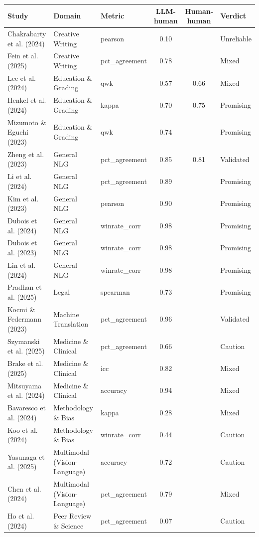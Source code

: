 \begin{tabular}{@{}l l l c c l@{}}
\toprule
Study & Domain & Metric & LLM-human & Human-human & Verdict \\
\midrule
Chakrabarty et al. (2024) & Creative Writing & pearson & 0.10 &  & Unreliable \\
Fein et al. (2025) & Creative Writing & pct\_agreement & 0.78 &  & Mixed \\
Lee et al. (2024) & Education \& Grading & qwk & 0.57 & 0.66 & Mixed \\
Henkel et al. (2024) & Education \& Grading & kappa & 0.70 & 0.75 & Promising \\
Mizumoto \& Eguchi (2023) & Education \& Grading & qwk & 0.74 &  & Promising \\
Zheng et al. (2023) & General NLG & pct\_agreement & 0.85 & 0.81 & Validated \\
Li et al. (2024) & General NLG & pct\_agreement & 0.89 &  & Promising \\
Kim et al. (2023) & General NLG & pearson & 0.90 &  & Promising \\
Dubois et al. (2024) & General NLG & winrate\_corr & 0.98 &  & Promising \\
Dubois et al. (2023) & General NLG & winrate\_corr & 0.98 &  & Promising \\
Lin et al. (2024) & General NLG & winrate\_corr & 0.98 &  & Promising \\
Pradhan et al. (2025) & Legal & spearman & 0.73 &  & Promising \\
Kocmi \& Federmann (2023) & Machine Translation & pct\_agreement & 0.96 &  & Validated \\
Szymanski et al. (2025) & Medicine \& Clinical & pct\_agreement & 0.66 &  & Caution \\
Brake et al. (2025) & Medicine \& Clinical & icc & 0.82 &  & Mixed \\
Mitsuyama et al. (2024) & Medicine \& Clinical & accuracy & 0.94 &  & Mixed \\
Bavaresco et al. (2024) & Methodology \& Bias & kappa & 0.28 &  & Mixed \\
Koo et al. (2024) & Methodology \& Bias & winrate\_corr & 0.44 &  & Caution \\
Yasunaga et al. (2025) & Multimodal (Vision-Language) & accuracy & 0.72 &  & Caution \\
Chen et al. (2024) & Multimodal (Vision-Language) & pct\_agreement & 0.79 &  & Mixed \\
Ho et al. (2024) & Peer Review \& Science & pct\_agreement & 0.07 &  & Caution \\

\end{tabular}
